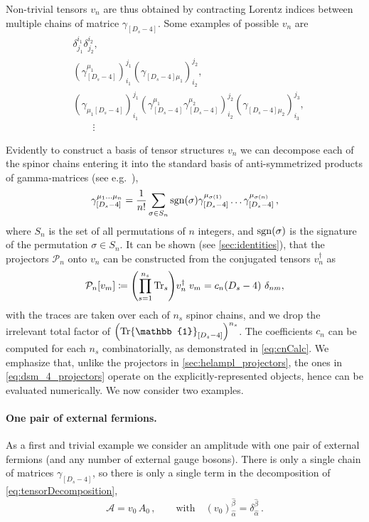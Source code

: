 Non-trivial tensors $v_n$ are thus obtained by contracting
Lorentz indices between multiple chains of  matrice $\gamma_{[D_s-4]}$.
Some examples of possible $v_n$ are
\begin{equation}
  \begin{aligned}
    & \delta^{i_1}_{j_1} \delta^{i_2}_{j_2},\\
    & (\gamma_{[D_s-4]}^{\mu_1} )_{i_1}^{j_1} (\gamma_{[D_s-4]\mu_1}^{\phantom{\mu}})_{i_2}^{j_2}, \\
    & (\gamma_{\mu_1[D_s-4]}^{\phantom{\mu}} )_{i_1}^{j_1} (\gamma_{[D_s-4]}^{\mu_1}\gamma_{[D_s-4]}^{\mu_2} )_{i_2}^{j_2} (\gamma_{[D_s-4]\mu_2}^{\phantom{\mu}})_{i_3}^{j_3},\\
    & \qquad \vdots{}
  \end{aligned}
\end{equation}

Evidently to construct a basis of tensor structures $v_n$ we can decompose each of the spinor chains entering it
into the standard basis of anti-symmetrized products of gamma-matrices (see e.g.\ \cite{Veltman:1988au}),
\begin{align}\label{eq:basisGammaChainDs}
\gamma_{[D_s-4]}^{\mu_1 \ldots \mu_n} = \frac{1}{n!} \sum_{ \sigma\in S_n} \operatorname{sgn}(\sigma) \gamma_{[D_s-4]}^{\mu_{\sigma(1)}} \ldots \gamma_{[D_s-4]}^{\mu_{\sigma(n)}}\,,
\end{align}
where $S_n$ is the set of all permutations of $n$ integers, and $\operatorname{sgn}(\sigma)$ is the signature of the permutation $\sigma\in S_n$.
It can be shown (see \cref{sec:identities}), that the
projectors $\mathcal{P}_n$ onto $v_n$ can be constructed from the conjugated tensors $v_n^\dagger$ as
\begin{align} \label{eq:dsm_4_projectors}
  \mathcal{P}_n [v_m] \coloneqq \qty(\prod_{s=1}^{n_s} \Tr_s) v_n^\dagger\; v_m = c_n(D_s-4)~\delta_{n m},  %
\end{align}
with the traces are taken over each of $n_s$ spinor chains, and we drop the irrelevant total factor of $\qty(\Tr\mathbb{1}_{[D_s -4 ]})^{n_s}$.
The coefficients $c_n$ can be computed for each $n_s$ combinatorially, as demonstrated in \cref{eq:cnCalc}.
We emphasize that, unlike the projectors in \cref{sec:helampl_projectors}, the ones in \cref{eq:dsm_4_projectors}
operate on the explicitly-represented objects, hence can be evaluated numerically.
We now consider two examples.

\paragraph{One pair of external fermions.}
As a first and trivial example we consider an amplitude with one pair of external fermions (and any number of external gauge bosons). 
There is only a single chain of matrices $\gamma_{[D_s-4]}$, so
there is only a single term in the decomposition of \cref{eq:tensorDecomposition},
\begin{equation}\label{eq:decompqqbar}
  \mathcal{A} =v_0\,A_0\,,\qquad \textrm{with}\quad (v_0)_{\hat{\alpha}}^{\hat{\beta}}=\delta_{\hat{\alpha}}^{\hat{\beta}}\,.
\end{equation}
